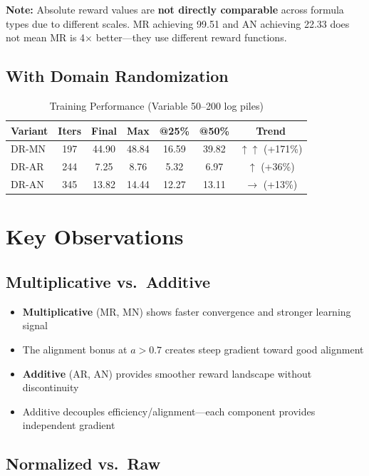 \documentclass[11pt]{article}
\begin{document}
\textbf{Note:} Absolute reward values are \textbf{not directly comparable} across formula types due to different scales. MR achieving 99.51 and AN achieving 22.33 does not mean MR is 4$\times$ better---they use different reward functions.

\subsection{With Domain Randomization}

\begin{table}[h]
\centering
\caption{Training Performance (Variable 50--200 log piles)}
\begin{tabular}{lcccccc}
\toprule
\textbf{Variant} & \textbf{Iters} & \textbf{Final} & \textbf{Max} & \textbf{@25\%} & \textbf{@50\%} & \textbf{Trend} \\
\midrule
DR-MN & 197 & 44.90 & 48.84 & 16.59 & 39.82 & $\uparrow\uparrow$ (+171\%) \\
DR-AR & 244 & 7.25 & 8.76 & 5.32 & 6.97 & $\uparrow$ (+36\%) \\
DR-AN & 345 & 13.82 & 14.44 & 12.27 & 13.11 & $\rightarrow$ (+13\%) \\
\bottomrule
\end{tabular}
\label{tab:dr}
\end{table}

\section{Key Observations}

\subsection{Multiplicative vs.\ Additive}

\begin{itemize}
    \item \textbf{Multiplicative} (MR, MN) shows faster convergence and stronger learning signal
    \item The alignment bonus at $a > 0.7$ creates steep gradient toward good alignment
    \item \textbf{Additive} (AR, AN) provides smoother reward landscape without discontinuity
    \item Additive decouples efficiency/alignment---each component provides independent gradient
\end{itemize}

\subsection{Normalized vs.\ Raw}
\end{document}
